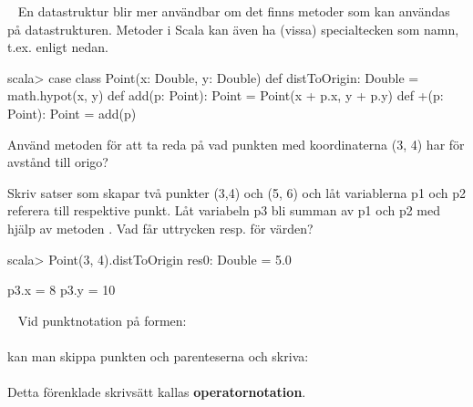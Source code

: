 \SOLUTION


\TaskSolved \what

\SubtaskSolved  {}


\QUESTEND









\QUESTBEGIN

\Task \label{task:point} \what~   En datastruktur blir mer användbar om det finns metoder som kan användas på datastrukturen. Metoder i Scala kan även ha (vissa) specialtecken som namn, t.ex. \code{+} enligt nedan.
\begin{REPL}
scala> case class Point(x: Double, y: Double) {
         def distToOrigin: Double = math.hypot(x, y)
         def add(p: Point): Point = Point(x + p.x, y + p.y)
         def +(p: Point): Point = add(p)
       }
\end{REPL}

\Subtask Använd metoden  för att ta reda på vad punkten med koordinaterna (3, 4) har för avstånd till origo?

\Subtask Skriv satser som skapar två punkter (3,4) och (5, 6) och låt variablerna p1 och p2 referera till respektive punkt. Låt variabeln p3 bli summan av p1 och p2 med hjälp av metoden . Vad får uttrycken  resp.  för värden?



\SOLUTION


\TaskSolved \what


\SubtaskSolved
\begin{REPLnonum}
scala> Point(3, 4).distToOrigin
res0: Double = 5.0
\end{REPLnonum}

\SubtaskSolved
p3.x = 8
p3.y = 10


\QUESTEND









\QUESTBEGIN

\Task  \what~  Vid punktnotation på formen: \\  \\ kan man skippa punkten och parenteserna och skriva:\\   \\
Detta förenklade skrivsätt kallas \textbf{operatornotation}.

